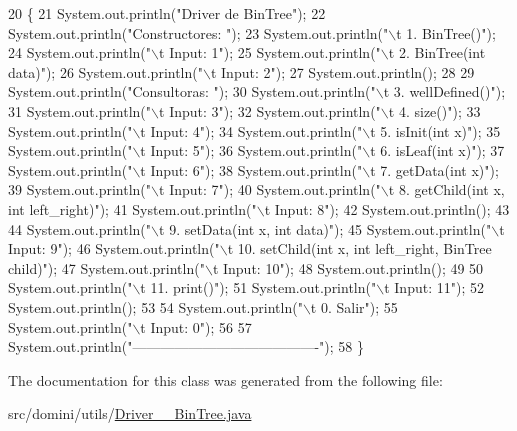 \begin{DoxyCode}
20                                      \{
21         System.out.println(\textcolor{stringliteral}{"Driver de BinTree"});
22         System.out.println(\textcolor{stringliteral}{"Constructores: "});
23         System.out.println(\textcolor{stringliteral}{"\(\backslash\)t 1. BinTree()"});
24         System.out.println(\textcolor{stringliteral}{"\(\backslash\)t Input: 1"});
25         System.out.println(\textcolor{stringliteral}{"\(\backslash\)t 2. BinTree(int data)"});
26         System.out.println(\textcolor{stringliteral}{"\(\backslash\)t Input: 2"});
27         System.out.println();
28 
29         System.out.println(\textcolor{stringliteral}{"Consultoras: "});
30         System.out.println(\textcolor{stringliteral}{"\(\backslash\)t 3. wellDefined()"});
31         System.out.println(\textcolor{stringliteral}{"\(\backslash\)t Input: 3"});
32         System.out.println(\textcolor{stringliteral}{"\(\backslash\)t 4. size()"});
33         System.out.println(\textcolor{stringliteral}{"\(\backslash\)t Input: 4"});
34         System.out.println(\textcolor{stringliteral}{"\(\backslash\)t 5. isInit(int x)"});
35         System.out.println(\textcolor{stringliteral}{"\(\backslash\)t Input: 5"});
36         System.out.println(\textcolor{stringliteral}{"\(\backslash\)t 6. isLeaf(int x)"});
37         System.out.println(\textcolor{stringliteral}{"\(\backslash\)t Input: 6"});
38         System.out.println(\textcolor{stringliteral}{"\(\backslash\)t 7. getData(int x)"});
39         System.out.println(\textcolor{stringliteral}{"\(\backslash\)t Input: 7"});
40         System.out.println(\textcolor{stringliteral}{"\(\backslash\)t 8. getChild(int x, int left\_right)"});
41         System.out.println(\textcolor{stringliteral}{"\(\backslash\)t Input: 8"});
42         System.out.println();
43 
44         System.out.println(\textcolor{stringliteral}{"\(\backslash\)t 9. setData(int x, int data)"});
45         System.out.println(\textcolor{stringliteral}{"\(\backslash\)t Input: 9"});
46         System.out.println(\textcolor{stringliteral}{"\(\backslash\)t 10. setChild(int x, int left\_right, BinTree child)"});
47         System.out.println(\textcolor{stringliteral}{"\(\backslash\)t Input: 10"});
48         System.out.println();
49 
50         System.out.println(\textcolor{stringliteral}{"\(\backslash\)t 11. print()"});
51         System.out.println(\textcolor{stringliteral}{"\(\backslash\)t Input: 11"});
52         System.out.println();
53 
54         System.out.println(\textcolor{stringliteral}{"\(\backslash\)t 0. Salir"});
55         System.out.println(\textcolor{stringliteral}{"\(\backslash\)t Input: 0"});
56 
57         System.out.println(\textcolor{stringliteral}{"----------------------------------------"});
58     \}
\end{DoxyCode}


The documentation for this class was generated from the following file\+:\begin{DoxyCompactItemize}
\item 
src/domini/utils/\hyperlink{Driver____BinTree_8java}{Driver\+\_\+\+\_\+\+Bin\+Tree.\+java}\end{DoxyCompactItemize}

